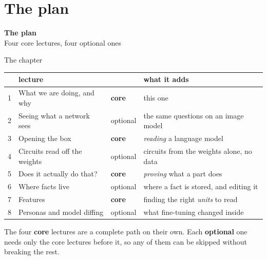 \documentclass[aspectratio=169]{beamer}
\newcommand{\keybox}[1]{%
  \begin{tcolorbox}[colback=armblue!8, colframe=armblue, boxrule=0.6pt, arc=2pt]
  #1
  \end{tcolorbox}}
\newcommand{\sectiontransition}[2]{%
  \begin{frame}[plain]
    \vfill
    \begin{center}
      {\Huge\bfseries\color{popblue} #1}\\[1.1em]
      {\large #2}
    \end{center}
    \vfill
  \end{frame}}
\begin{document}
\section{The plan}
\sectiontransition{The plan}{Four core lectures, four optional ones}

\begin{frame}{The chapter}
  \vspace{-0.1em}
  \begin{center}
  \small
  \begin{tabular}{@{}rp{}lp{}@{}}
    \toprule
    & \textbf{lecture} & & \textbf{what it adds}\\
    \midrule
    1 & What we are doing, and why & \textcolor{popblue}{\textbf{core}} & this one\\
    2 & Seeing what a network sees & \textcolor{armorange}{optional} & the same questions on an image model\\
    3 & Opening the box & \textcolor{popblue}{\textbf{core}} & \emph{reading} a language model\\
    4 & Circuits read off the weights & \textcolor{armorange}{optional} & circuits from the weights alone, no data\\
    5 & Does it actually do that? & \textcolor{popblue}{\textbf{core}} & \emph{proving} what a part does\\
    6 & Where facts live & \textcolor{armorange}{optional} & where a fact is stored, and editing it\\
    7 & Features & \textcolor{popblue}{\textbf{core}} & finding the right \emph{units} to read\\
    8 & Personas and model diffing & \textcolor{armorange}{optional} & what fine-tuning changed inside\\
    \bottomrule
  \end{tabular}
  \end{center}

  \vspace{0.4em}
  \keybox{\small The four \textbf{core} lectures are a complete path on their own. Each
  \textbf{optional} one needs only the core lectures before it, so any of them can be skipped
  without breaking the rest.}
\end{frame}
\end{document}

